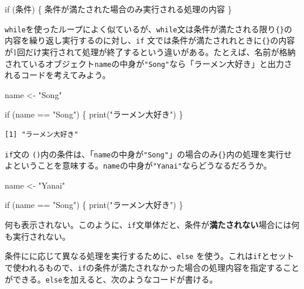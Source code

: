 \documentclass[
  a4paper,
  pandoc,
  ja=standard,
  jafont=haranoaji]{bxjsbook}
\newenvironment{Shaded}{\begin{snugshade}}{\end{snugshade}}
\newcommand{\ControlFlowTok}[1]{\textcolor[rgb]{0.00,0.48,0.65}{#1}}
\newcommand{\FunctionTok}[1]{\textcolor[rgb]{0.28,0.35,0.67}{#1}}
\newcommand{\NormalTok}[1]{\textcolor[rgb]{0.00,0.48,0.65}{#1}}
\newcommand{\OtherTok}[1]{\textcolor[rgb]{0.00,0.48,0.65}{#1}}
\newcommand{\SpecialCharTok}[1]{\textcolor[rgb]{0.37,0.37,0.37}{#1}}
\newcommand{\StringTok}[1]{\textcolor[rgb]{0.13,0.47,0.30}{#1}}
\begin{document}
\begin{Shaded}
\begin{Highlighting}[]
\ControlFlowTok{if}\NormalTok{ (条件) \{}
\NormalTok{  条件が満たされた場合のみ実行される処理の内容}
\NormalTok{\}}
\end{Highlighting}
\end{Shaded}

\texttt{while}を使ったループによく似ているが、\texttt{while}文は条件が満たされる限り\texttt{\{\}}の内容を繰り返し実行するのに対し、\texttt{if}
文では条件が満たされれときに\texttt{\{\}}の内容が1回だけ実行されて処理が終了するという違いがある。たとえば、名前が格納されているオブジェクト\texttt{name}の中身が\texttt{"Song"}なら「ラーメン大好き」と出力されるコードを考えてみよう。

\begin{Shaded}
\begin{Highlighting}[numbers=left,,]
\NormalTok{name }\OtherTok{\textless{}{-}} \StringTok{"Song"}

\ControlFlowTok{if}\NormalTok{ (name }\SpecialCharTok{==} \StringTok{"Song"}\NormalTok{) \{}
  \FunctionTok{print}\NormalTok{(}\StringTok{"ラーメン大好き"}\NormalTok{)}
\NormalTok{\}}
\end{Highlighting}
\end{Shaded}

\begin{verbatim}
[1] "ラーメン大好き"
\end{verbatim}

\texttt{if}文の
\texttt{()}内の条件は、「\texttt{name}の中身が\texttt{"Song"}」の場合のみ\texttt{\{\}}内の処理を実行せよということを意味する。\texttt{name}の中身が\texttt{"Yanai"}ならどうなるだろうか。

\begin{Shaded}
\begin{Highlighting}[numbers=left,,]
\NormalTok{name }\OtherTok{\textless{}{-}} \StringTok{"Yanai"}

\ControlFlowTok{if}\NormalTok{ (name }\SpecialCharTok{==} \StringTok{"Song"}\NormalTok{) \{}
  \FunctionTok{print}\NormalTok{(}\StringTok{"ラーメン大好き"}\NormalTok{)}
\NormalTok{\}}
\end{Highlighting}
\end{Shaded}

何も表示されない。このように、\texttt{if}文単体だと、条件が\textbf{満たされない}場合には何も実行されない。

条件にに応じて異なる処理を実行するために、\texttt{else}
を使う。これは\texttt{if}とセットで使われるもので、\texttt{if}の条件が満たされなかった場合の処理内容を指定することができる。\texttt{else}を加えると、次のようなコードが書ける。
\end{document}
